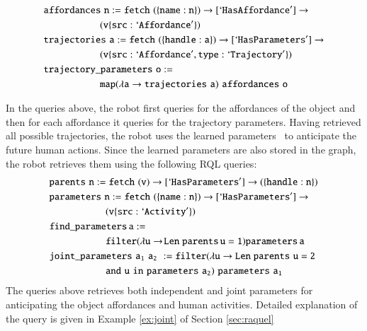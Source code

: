 {\small
\begin{align}
&{\tt {affordances} \,\, n := fetch \,\,(\{name:n\})\rightarrow   [`HasAffordance'] \rightarrow } \cr
& {\tt \hspace*{2cm} (v\{src:`Affordance'\})   \nonumber } \\
&{\tt {trajectories} \,\, a := fetch \,\,(\{handle:a\})\rightarrow [`HasParameters']\rightarrow } \cr
& {\tt \hspace*{2cm}  (v\{src:`Affordance', type:`Trajectory'\})  \nonumber } \\
& {\tt { trajectory\_parameters} \,\, o := \,\, } \cr
&{\tt \hspace*{2cm} map (\lambda a \rightarrow {trajectories}\,\, a)  \,\, {affordances}\,\, o } \nonumber
\end{align}
}


In the queries above, the robot first queries for the affordances of the object and then for each affordance it queries \robobrain{} for the trajectory parameters. Having retrieved all possible trajectories, the robot uses the learned parameters~\citep{KoppulaRSS2013} to anticipate the future human actions. Since the learned parameters are also stored in the \robobrain{} graph, the robot retrieves them using the following RQL queries:
{\small
\begin{align*}
&{\tt {parents} \,\, n := fetch \,\, (v)\rightarrow [`HasParameters']\rightarrow  (\{handle:n\}) }\nonumber \\
& {\tt {parameters} \,\, n :=  fetch \,\, (\{name:n\})\rightarrow [`HasParameters']\rightarrow }\cr
& {\tt \hspace*{2cm}  (v\{src:`Activity'\})   \nonumber } \\
& {\tt find\_parameters\, a := }\\
& \hspace*{2cm}{\tt filter (\lambda u \rightarrow\! {Len\; parents}\, u = 1)     {parameters}\, a \nonumber } \\
& {\tt {joint\_parameters} \,\, a_1 \,\, a_2\,\, := filter (\lambda u \rightarrow {Len\; parents}\,\, u = 2\,\, } \cr
& {\tt \hspace*{2cm}  and\,\, u \,\, in \,\, {parameters}\,\, a_2)    \,\,{parameters}\,\, a_1 \nonumber}
\end{align*}
}
The queries above retrieves both independent and joint parameters for anticipating the object affordances and human activities. Detailed explanation of the query is given in Example \ref{ex:joint} of Section \ref{sec:raquel}


